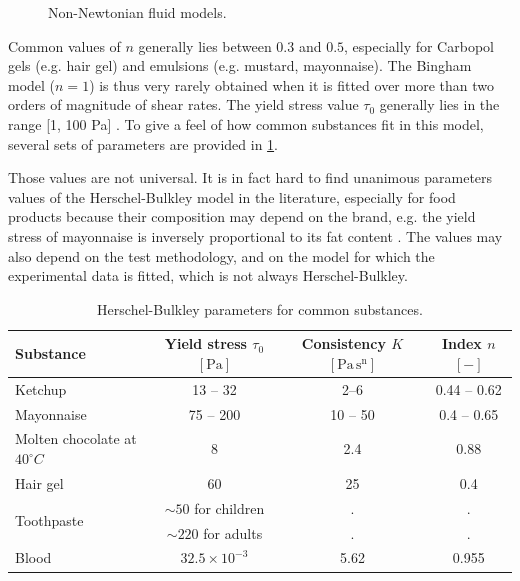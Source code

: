 \documentclass[11 pt]{report}
\begin{document}
\begin{figure}[t]
    \centering
    
    \caption{Non-Newtonian fluid models.}
    \label{fig:fluid-classification}
\end{figure}

Common values of $n$ generally lies between $0.3$ and $0.5$, especially for Carbopol gels (e.g. hair gel) and emulsions (e.g. mustard, mayonnaise). The Bingham model ($n = 1$) is thus very rarely obtained when it is fitted over more than two orders of magnitude of shear rates. The yield stress value $\tau_0$ generally lies in the range [1, 100 Pa] \cite{Coussot}. To give a feel of how common substances fit in this model, several sets of parameters are provided in \cref{tab:parameters}.

Those values are not universal. It is in fact hard to find unanimous parameters values of the Herschel-Bulkley model in the literature, especially for food products because their composition may depend on the brand, e.g. the yield stress of mayonnaise is inversely proportional to its fat content \cite{mayonnaiseFat}. The values may also depend on the test methodology, and on the model for which the experimental data is fitted, which is not always Herschel-Bulkley.

\begin{table}[t]
    \centering
    \begin{tabular}[t]{lccc}
        \toprule
        Substance 
        & Yield stress $\tau_0$ $[\mathrm{Pa}]$ 
        & Consistency $K$ $[\mathrm{Pa \, s^n}]$ 
        & Index $n$ $[-]$\\
        \midrule
        Ketchup \cite{ketchup}       & 13 -- 32 & 2--6 & 0.44 -- 0.62 \\[2pt]
        Mayonnaise \cite{mayonnaise1,mayonnaise2} & 75 -- 200 & 10 -- 50 & 0.4 -- 0.65 \\[2pt]
        Molten chocolate at $40^\circ C$ \cite{chocolate} & 8 & 2.4 & 0.88 \\[2pt]
        Hair gel \cite{gel}                     & 60 & 25 & 0.4 \\[2pt]
        \multirow{2}{*}{Toothpaste\cite{toothpaste}}
                                     & $\sim 50$ for children & . & . \\
                                     & $\sim 220$ for adults & . & . \\[2pt]
        Blood \cite{Lee2011}         & $32.5\times 10^{-3}$ & 5.62 & 0.955 \\[2pt]
        \bottomrule
    \end{tabular}
    \caption{Herschel-Bulkley parameters for common substances.}
    \label{tab:parameters}
\end{table}%
\end{document}

